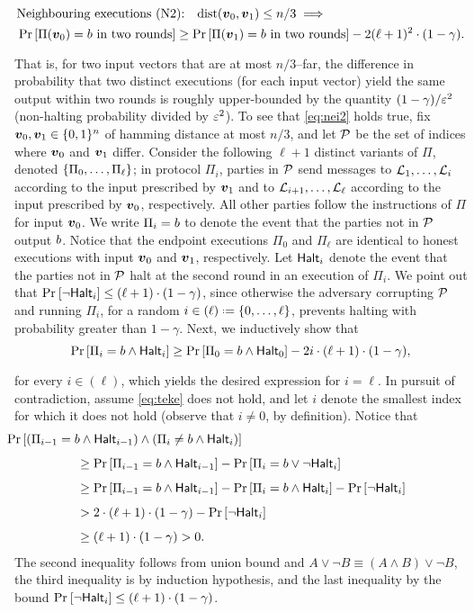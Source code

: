 \begin{align} \label{eq:nei2}
&\text{Neighbouring executions (N2):} \quad \mathrm{dist}({ \boldsymbol{v}}_0,{ \boldsymbol{v}}_1)\le n/3 \implies \\
& \Pr_{}\left[\Pi({ \boldsymbol{v}}_0)=b\text{ in two rounds}\right] \ge \Pr_{}\left[ \Pi({ \boldsymbol{v}}_1)=b\text{ in two rounds}\right] - 2 (\ell +1)^2 \cdot (1-\gamma). \nonumber
\end{align}
That is, for two input vectors that are at most $n/3$--far, the difference in probability that two distinct executions (for each input vector) yield the same output within two rounds is roughly upper-bounded by the quantity $(1-\gamma)/\varepsilon^2$ (\ie non-halting probability divided by $\varepsilon^2$). To see that \cref{eq:nei2} holds true, fix ${ \boldsymbol{v}}_0,{ \boldsymbol{v}}_1\in {\{0,1\}^n}$ of hamming distance at most $n/3$, and let $\mathcal{P}$ be the set of indices where ${ \boldsymbol{v}}_0$ and ${ \boldsymbol{v}}_1$ differ. Consider the following $\ell+1$ distinct variants of $\Pi$, denoted $\left\{\Pi_0,\ldots, \Pi_\ell\right\}$; in protocol $\Pi_i$, parties in $\mathcal{P}$ send messages to ${\cal{L}}_1,\ldots, {\cal{L}}_i$ according to the input prescribed by ${ \boldsymbol{v}}_1$ and to ${\cal{L}}_{i+1},\ldots, {\cal{L}}_\ell$ according to the input prescribed by ${ \boldsymbol{v}}_0$, respectively. All other parties follow the instructions of $\Pi$ for input ${ \boldsymbol{v}}_0$. We write $\Pi_i=b$ to denote the event that the parties not in $\mathcal{P}$ output $b$. Notice that the endpoint executions $\Pi_0$ and $\Pi_{\ell}$ are identical to honest executions with input ${ \boldsymbol{v}}_0$ and ${ \boldsymbol{v}}_1$, respectively. Let $\mathsf{Halt}_i$ denote the event that the parties not in $\mathcal{P}$ halt at the second round in an execution of $\Pi_{i}$. We point out that $\Pr_{}\left[ \neg \mathsf{Halt}_i\right]\le (\ell+1)\cdot (1-\gamma)$, since otherwise the adversary corrupting $\mathcal{P}$ and running $\Pi_i$, for a random $i\in (\ell) \assign \set{0,\ldots,\ell}$, prevents halting with probability greater than $1-\gamma$. Next, we inductively show that
\begin{align}
\Pr_{}\left[\Pi_i=b \land \mathsf{Halt}_i\right] \ge \Pr_{}\left[\Pi_{0} =b \land \mathsf{Halt}_0\right] - 2i\cdot (\ell+1) \cdot (1-\gamma),\label{eq:teke}
\end{align}
for every $i\in (\ell)$, which yields the desired expression for $i=\ell$. In pursuit of contradiction, assume \cref{eq:teke} does not hold, and let $i$ denote the smallest index for which it does not hold (observe that $i\ne 0$, by definition). Notice that
\begin{align*}
& \hspace*{-2cm}\pr{(\Pi_{i-1}= \o \land \halt_{i-1}) \land (\Pi_{i }\neq \o\land \halt_i)}\\
&\ge \pr{\Pi_{i-1}=\o \land \halt_{i-1}}-\pr{ \Pi_{i }= \o\vee \neg \halt_i}\\
&\ge \pr{\Pi_{i-1}=\o \land \halt_{i-1}}-\pr{ \Pi_{i }= \o\land \halt_i} - \pr{ \neg \halt_i}\\
&> 2\cdot (\ell+1) \cdot (1-\gamma) - \pr{ \neg \halt_i} \\
&\ge (\ell+1) \cdot (1-\gamma) > 0.
\end{align*}
The second inequality follows from union bound and $A\lor \neg B\equiv (A\land B) \lor \neg B$, the third inequality is by induction hypothesis, and the last inequality by the bound $\Pr_{}\left[ \neg \mathsf{Halt}_i\right]\le (\ell+1)\cdot (1-\gamma)$.

